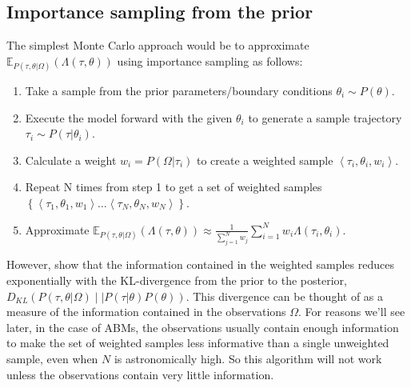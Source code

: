 \documentclass{article}
\begin{document}
\subsection{Importance sampling from the prior}
The simplest Monte Carlo approach would be to approximate $\mathbb{E}_{P(\tau,\theta|\Omega)}(\Lambda(\tau,\theta))$ using importance sampling as follows:
\begin{enumerate}
\item Take a sample from the prior parameters/boundary conditions $\theta_i \sim P(\theta)$.
\item Execute the model forward with the given $\theta_i$ to generate a sample trajectory $\tau_{i} \sim P(\tau|\theta_i)$.
\item Calculate a weight $w_i = P(\Omega|\tau_i)$ to create a weighted sample $\left<\tau_{i},\theta_i, w_i\right>$.
\item Repeat  N times from step 1 to get a set of weighted samples $\left\{\left<\tau_1,\theta_1,w_1\right> \dots \left<\tau_N,\theta_N,w_N\right> \right\}$.
\item Approximate $\mathbb{E}_{P(\tau,\theta|\Omega)}(\Lambda(\tau,\theta)) \approx \frac{1}{\sum_{j=1}^Nw_j}\sum_{i=1}^N w_i\Lambda(\tau_i,\theta_i)$.
\end{enumerate}

However, \citet{chatterjee2018sample} show that the information contained in the weighted samples reduces exponentially with the KL-divergence from the prior to the posterior, $D_{KL}\left(P(\tau,\theta|\Omega) \mid\mid P(\tau|\theta)P(\theta) \right)$. This divergence can be thought of as a measure of the information contained in the observations $\Omega$. For reasons we'll see later, in the case of ABMs, the observations usually contain enough information to make the set of weighted samples less informative than a single unweighted sample, even when $N$ is astronomically high. So this algorithm will not work unless the observations contain very little information.
\end{document}
